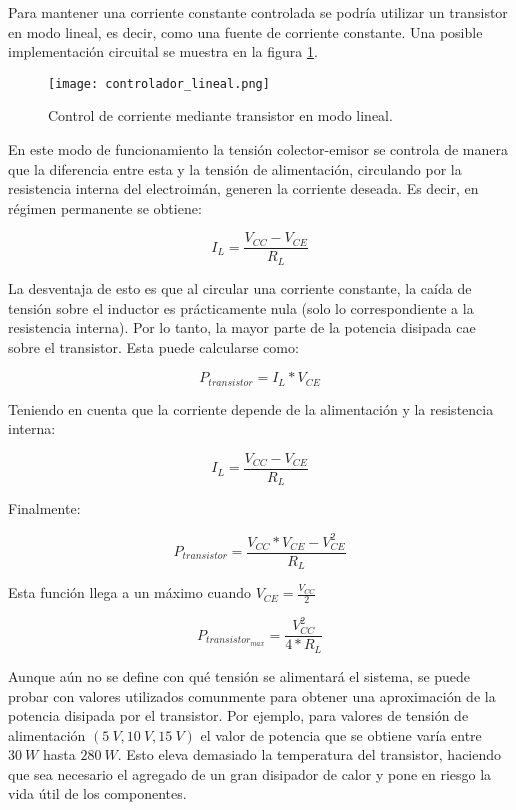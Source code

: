 Para mantener una corriente constante controlada se podría utilizar un transistor en modo lineal, es decir, como una fuente de corriente constante. Una posible implementación circuital se muestra en la figura \ref{fig:img_controlador-lineal}.

\begin{figure}[H]
	\centering
	\texttt{[image: controlador\_lineal.png]}
	\caption{Control de corriente mediante transistor en modo lineal.}
	\label{fig:img_controlador-lineal}
\end{figure}

En este modo de funcionamiento la tensión colector-emisor se controla de manera que la diferencia entre esta y la tensión de alimentación, circulando por la resistencia interna del electroimán, generen la corriente deseada. Es decir, en régimen permanente se obtiene:
 
 \begin{equation} \label{eq_corriente_temporal}
 	I_L=\frac{V_{CC}-V_{CE}}{R_L}
 \end{equation}
 
La desventaja de esto es que al circular una corriente constante, la caída de tensión sobre el inductor es prácticamente nula (solo lo correspondiente a la resistencia interna). Por lo tanto, la mayor parte de la potencia disipada cae sobre el transistor. Esta puede calcularse como: 

\begin{equation}
	P_{transistor} = I_L*V_{CE}
\end{equation}

Teniendo en cuenta que la corriente depende de la alimentación y la resistencia interna:

\begin{equation}
	I_L=\frac{V_{CC}-V_{CE}}{R_L}
\end{equation}

Finalmente:

\begin{equation}
	P_{transistor}=\frac{V_{CC}*V_{CE}-V_{CE}^2}{R_L}
\end{equation}

Esta función llega a un máximo cuando $V_{CE}=\frac{V_{CC}}{2}$


\begin{equation}
	P_{transistor_{max}}=\frac{V_{CC}^2}{4*R_L}
\end{equation}


Aunque aún no se define con qué tensión se alimentará el sistema, se puede probar con valores utilizados comunmente para obtener una aproximación de la potencia disipada por el transistor. Por ejemplo, para valores de tensión de alimentación $(5\:V,10\:V,15\:V)$ el valor de potencia que se obtiene varía entre $30\:W$ hasta $280\:W$. Esto eleva demasiado la temperatura del transistor, haciendo que sea necesario el agregado de un gran disipador de calor y pone en riesgo la vida útil de los componentes.

